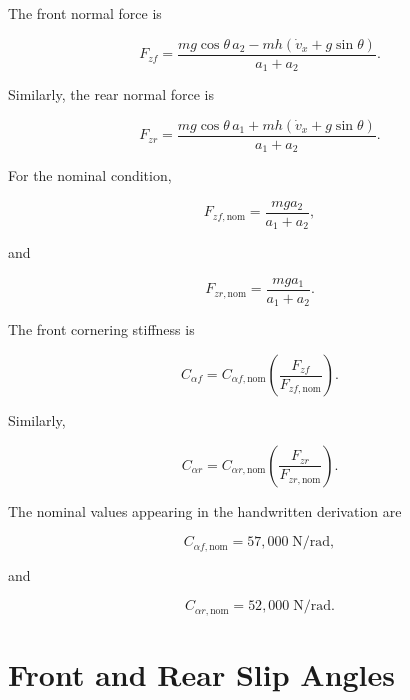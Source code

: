 \documentclass[12pt,a4paper]{article}
\begin{document}
The front normal force is

\begin{equation}
\boxed{
F_{zf}
=
\frac{
mg\cos\theta\,a_2
-
mh\left(\dot v_x+g\sin\theta\right)
}
{a_1+a_2}
}.
\end{equation}

Similarly, the rear normal force is

\begin{equation}
\boxed{
F_{zr}
=
\frac{
mg\cos\theta\,a_1
+
mh\left(\dot v_x+g\sin\theta\right)
}
{a_1+a_2}
}.
\end{equation}

For the nominal condition,

\begin{equation}
F_{zf,\mathrm{nom}}
=
\frac{mga_2}{a_1+a_2},
\end{equation}

and

\begin{equation}
F_{zr,\mathrm{nom}}
=
\frac{mga_1}{a_1+a_2}.
\end{equation}

The front cornering stiffness is

\begin{equation}
C_{\alpha f}
=
C_{\alpha f,\mathrm{nom}}
\left(
\frac{F_{zf}}
{F_{zf,\mathrm{nom}}}
\right).
\end{equation}

Similarly,

\begin{equation}
C_{\alpha r}
=
C_{\alpha r,\mathrm{nom}}
\left(
\frac{F_{zr}}
{F_{zr,\mathrm{nom}}}
\right).
\end{equation}

The nominal values appearing in the handwritten derivation are

\begin{equation}
C_{\alpha f,\mathrm{nom}}
=
57{,}000\;\mathrm{N/rad},
\end{equation}

and

\begin{equation}
C_{\alpha r,\mathrm{nom}}
=
52{,}000\;\mathrm{N/rad}.
\end{equation}

\section{Front and Rear Slip Angles}
\end{document}
